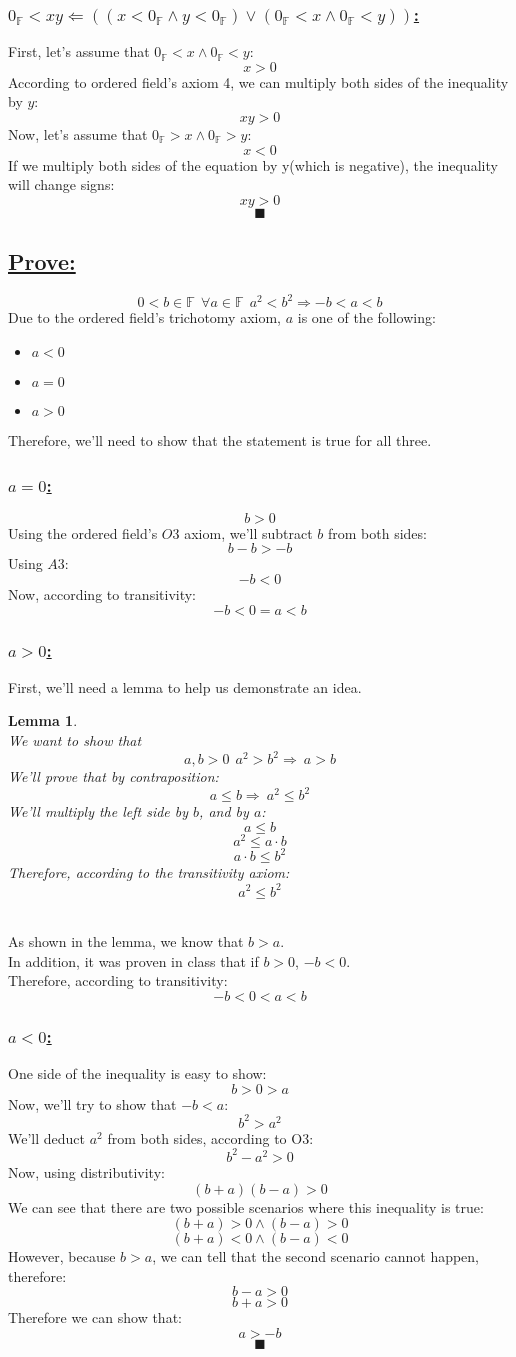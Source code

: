 \documentclass[a4paper, 12pt]{article}
\newcommand{\sub}[1]{\subsection{\underline{#1}}}
\newcommand{\subsub}[1]{\subsubsection{\underline{#1}}}
\newcommand{\?}{\stackrel{?}{=}}
\newcommand{\F}{\ensuremath{\mathbb{F}}}
\renewcommand{\qed}{$$\blacksquare$$}
\newtheorem{lemma}{Lemma}
\begin{document}
\subsub{$ 0_{\F}<xy \Longleftarrow ((x<0_{\F} \land y<0_{\F}) \lor (0_{\F} < x \land 0_{\F}<y))$:}
First, let's assume that $0_{\F} < x \land 0_{\F}<y$: $$x > 0 $$
According to ordered field's axiom 4, we can multiply both sides of the inequality by $y$: $$ xy > 0 $$
Now, let's assume that $0_{\F} > x \land 0_{\F}>y $: $$x < 0 $$
If we multiply both sides of the equation by y(which is negative), the inequality will change signs: $$ xy > 0 $$
\qed\pagebreak

\sub{Prove:}
$$ 0<b\in{\F}~~\forall{a}\in{\F}~~a^2<b^2 \Longrightarrow -b<a<b $$
Due to the ordered field's trichotomy axiom, $a$ is one of the following:
\begin{itemize}
    \item $a<0$
    \item $a=0$
    \item $a>0$
\end{itemize}
Therefore, we'll need to show that the statement is true for all three.

\subsub{$a=0$:}
$$ b>0 $$
Using the ordered field's $O3$ axiom, we'll subtract $b$ from both sides: $$ b-b > -b $$
Using $A3$: $$ -b < 0 $$
Now, according to transitivity: $$ -b < 0 = a < b $$

\subsub{$a>0$:}
First, we'll need a lemma to help us demonstrate an idea.
\begin{lemma}
    ~\\We want to show that $$ a,b>0 ~~ a^2 > b^2 \Longrightarrow~ a>b $$
    We'll prove that by contraposition: $$ a\leq{b} \Longrightarrow~ a^2\leq{b^2} $$
    We'll multiply the left side by $b$, and by $a$:
    $$ a\leq{b} $$
    $$ a^2\leq{a\cdot{b}} $$
    $$ a\cdot{b}\leq{b^2} $$
    Therefore, according to the transitivity axiom: $$ a^2 \leq{b^2} $$
\end{lemma}
\pagebreak
~\\As shown in the lemma, we know that $b>a$.\\
In addition, it was proven in class that if $b>0$, $-b<0$.\\
Therefore, according to transitivity:
$$ -b < 0 < a < b $$

\subsub{$a<0$:}
One side of the inequality is easy to show: $$ b>0>a $$
Now, we'll try to show that $-b<a$: $$ b^2 > a^2 $$
We'll deduct $a^2$ from both sides, according to O3: $$ b^2 - a^2 > 0 $$
Now, using distributivity: $$ (b+a)(b-a) > 0 $$
We can see that there are two possible scenarios where this inequality is true:
$$ (b+a) > 0 \land (b-a) > 0 $$
$$ (b+a) < 0 \land (b-a) < 0 $$
However, because $b>a$, we can tell that the second scenario cannot happen, therefore:
$$ b-a > 0 $$
$$ b+a > 0 $$
Therefore we can show that: $$ a > -b $$
\qed
\end{document}
